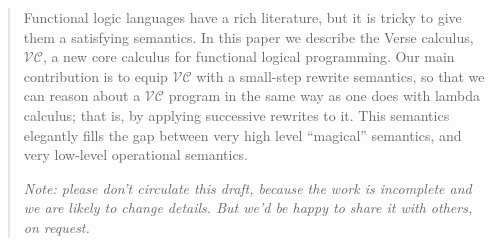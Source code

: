 \documentclass[acmsmall,review,dvipsnames]{acmart}
\newcommand{\versecalc}{$\mathcal{VC}$}
\begin{document}
\author{Simon Peyton Jones}

\author{Olin Shivers}

\author{Tim Sweeney}



\begin{abstract}
  Functional logic languages have a rich literature, but it is tricky
  to give them a satisfying semantics.  In this paper we describe the
  Verse calculus, \versecalc{}, a new core calculus for functional
  logical programming. Our main contribution is to equip \versecalc{} with a
  small-step rewrite semantics, so that we can reason
  about a \versecalc{} program in the same way as one does with lambda
  calculus; that is, by applying successive rewrites to it.
  This semantics elegantly fills the gap between very high level
  ``magical'' semantics, and very low-level operational semantics.

  \emph{Note: please don't circulate this draft, because the work is incomplete and we
    are likely to change details.  But we'd be happy to share it with others, on request.}
\end{abstract}
\end{document}
